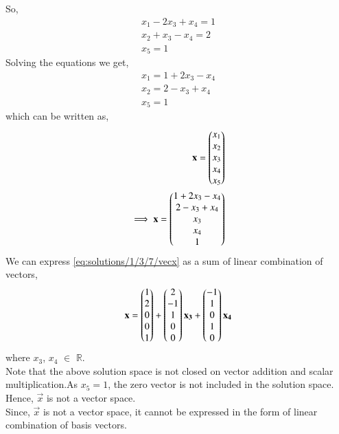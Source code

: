 So,
\begin{align}
x_1-2x_3+x_4=1\\
x_2+x_3-x_4=2\\
x_5=1
\end{align}
Solving the equations we get,
\begin{align}
x_1=1+2x_3-x_4\\
x_2=2-x_3+x_4\\
x_5=1
\end{align}
which can be written as,
   \begin{align}
   \mathbf{x} = \begin{pmatrix}x_1\\x_2\\x_3 \\ x_4 \\ x_5\end{pmatrix}\\
   \implies \mathbf{x}=\begin{pmatrix}1+2x_3-x_4\\2-x_3+x_4\\x_3\\x_4\\1\end{pmatrix}\label{eq:solutions/1/3/7/vecx}
\end{align}
We can express \eqref{eq:solutions/1/3/7/vecx} as a sum of linear combination of vectors,
\begin{align}
    \mathbf{x}=\begin{pmatrix}1\\2\\0\\0\\1\end{pmatrix}+\begin{pmatrix}2\\-1\\1\\0\\0\end{pmatrix}\mathbf{x_3}+\begin{pmatrix}-1\\1\\0\\1\\0\end{pmatrix}\mathbf{x_4}
\end{align}
where $x_3$, $x_4$ $\in$ $\mathbb{R}$.\\
Note that the above solution space is not closed on vector addition and scalar multiplication.As $x_5=1$, the zero vector is not included in the solution space. Hence, $\vec{x}$ is not a vector space. \\
Since, $\vec{x}$ is not a vector space, it cannot be expressed in the form of linear combination of basis vectors.
